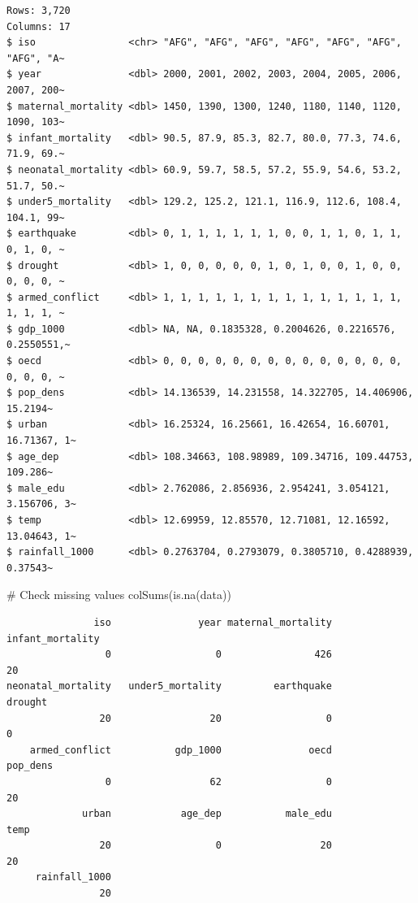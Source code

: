 \documentclass[
  letterpaper,
  DIV=11,
  numbers=noendperiod]{scrartcl}
\newenvironment{Shaded}{\begin{snugshade}}{\end{snugshade}}
\newcommand{\CommentTok}[1]{\textcolor[rgb]{0.37,0.37,0.37}{#1}}
\newcommand{\FunctionTok}[1]{\textcolor[rgb]{0.28,0.35,0.67}{#1}}
\newcommand{\NormalTok}[1]{\textcolor[rgb]{0.00,0.23,0.31}{#1}}
\begin{document}
\begin{verbatim}
Rows: 3,720
Columns: 17
$ iso                <chr> "AFG", "AFG", "AFG", "AFG", "AFG", "AFG", "AFG", "A~
$ year               <dbl> 2000, 2001, 2002, 2003, 2004, 2005, 2006, 2007, 200~
$ maternal_mortality <dbl> 1450, 1390, 1300, 1240, 1180, 1140, 1120, 1090, 103~
$ infant_mortality   <dbl> 90.5, 87.9, 85.3, 82.7, 80.0, 77.3, 74.6, 71.9, 69.~
$ neonatal_mortality <dbl> 60.9, 59.7, 58.5, 57.2, 55.9, 54.6, 53.2, 51.7, 50.~
$ under5_mortality   <dbl> 129.2, 125.2, 121.1, 116.9, 112.6, 108.4, 104.1, 99~
$ earthquake         <dbl> 0, 1, 1, 1, 1, 1, 1, 0, 0, 1, 1, 0, 1, 1, 0, 1, 0, ~
$ drought            <dbl> 1, 0, 0, 0, 0, 0, 1, 0, 1, 0, 0, 1, 0, 0, 0, 0, 0, ~
$ armed_conflict     <dbl> 1, 1, 1, 1, 1, 1, 1, 1, 1, 1, 1, 1, 1, 1, 1, 1, 1, ~
$ gdp_1000           <dbl> NA, NA, 0.1835328, 0.2004626, 0.2216576, 0.2550551,~
$ oecd               <dbl> 0, 0, 0, 0, 0, 0, 0, 0, 0, 0, 0, 0, 0, 0, 0, 0, 0, ~
$ pop_dens           <dbl> 14.136539, 14.231558, 14.322705, 14.406906, 15.2194~
$ urban              <dbl> 16.25324, 16.25661, 16.42654, 16.60701, 16.71367, 1~
$ age_dep            <dbl> 108.34663, 108.98989, 109.34716, 109.44753, 109.286~
$ male_edu           <dbl> 2.762086, 2.856936, 2.954241, 3.054121, 3.156706, 3~
$ temp               <dbl> 12.69959, 12.85570, 12.71081, 12.16592, 13.04643, 1~
$ rainfall_1000      <dbl> 0.2763704, 0.2793079, 0.3805710, 0.4288939, 0.37543~
\end{verbatim}

\begin{Shaded}
\begin{Highlighting}[]
\CommentTok{\# Check missing values}
\FunctionTok{colSums}\NormalTok{(}\FunctionTok{is.na}\NormalTok{(data))}
\end{Highlighting}
\end{Shaded}

\begin{verbatim}
               iso               year maternal_mortality   infant_mortality 
                 0                  0                426                 20 
neonatal_mortality   under5_mortality         earthquake            drought 
                20                 20                  0                  0 
    armed_conflict           gdp_1000               oecd           pop_dens 
                 0                 62                  0                 20 
             urban            age_dep           male_edu               temp 
                20                  0                 20                 20 
     rainfall_1000 
                20 
\end{verbatim}
\end{document}
